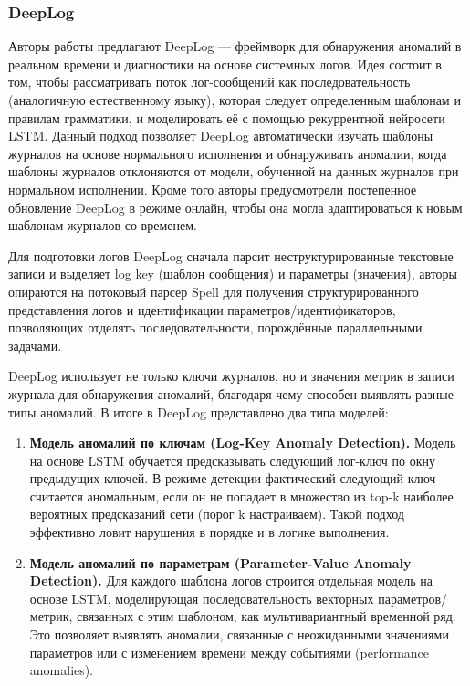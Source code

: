 \subsubsection{DeepLog}

Авторы работы \cite{DeepLog} предлагают DeepLog — фреймворк для обнаружения аномалий в реальном времени и диагностики на основе системных логов. Идея состоит в том, чтобы рассматривать поток лог-сообщений как последовательность (аналогичную естественному языку), которая следует определенным шаблонам и правилам грамматики, и моделировать её с помощью рекуррентной нейросети LSTM. Данный подход позволяет DeepLog автоматически изучать шаблоны журналов на основе нормального исполнения и обнаруживать аномалии, когда шаблоны журналов отклоняются от модели, обученной на данных журналов при нормальном исполнении. Кроме того авторы предусмотрели постепенное обновление DeepLog в режиме онлайн, чтобы она могла адаптироваться к новым шаблонам журналов со временем.

Для подготовки логов DeepLog сначала парсит неструктурированные текстовые записи и выделяет log key (шаблон сообщения) и параметры (значения), авторы опираются на потоковый парсер Spell для получения структурированного представления логов и идентификации параметров/идентификаторов, позволяющих отделять последовательности, порождённые параллельными задачами.

DeepLog использует не только ключи журналов, но и значения метрик в записи журнала для обнаружения аномалий, благодаря чему способен выявлять разные типы аномалий. В итоге в DeepLog представлено два типа моделей:

\begin{enumerate}
    \item \textbf{Модель аномалий по ключам (Log-Key Anomaly Detection).} Модель на основе LSTM обучается предсказывать следующий лог-ключ по окну предыдущих ключей. В режиме детекции фактический следующий ключ считается аномальным, если он не попадает в множество из top-k наиболее вероятных предсказаний сети (порог k настраиваем). Такой подход эффективно ловит нарушения в порядке и в логике выполнения.
    \item \textbf{Модель аномалий по параметрам (Parameter-Value Anomaly Detection).} Для каждого шаблона логов строится отдельная модель на основе LSTM, моделирующая последовательность векторных параметров/метрик, связанных с этим шаблоном, как мультивариантный временной ряд. Это позволяет выявлять аномалии, связанные с неожиданными значениями параметров или с изменением времени между событиями (performance anomalies).
\end{enumerate}

